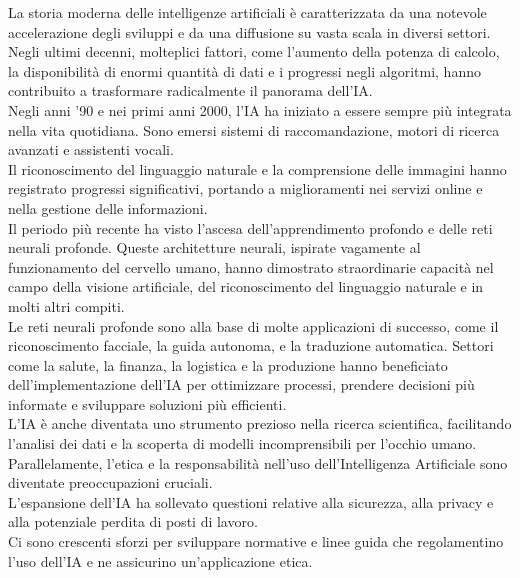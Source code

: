 \documentclass[12pt,a4paper]{report}
\begin{document}
La storia moderna delle intelligenze artificiali è caratterizzata da una notevole accelerazione degli sviluppi e da una diffusione su vasta scala in diversi settori. \\
Negli ultimi decenni, molteplici fattori, come l'aumento della potenza di calcolo, la disponibilità di enormi quantità di dati e i progressi negli algoritmi, hanno contribuito a trasformare radicalmente il panorama dell'IA. \\
Negli anni '90 e nei primi anni 2000, l'IA ha iniziato a essere sempre più integrata nella vita quotidiana. Sono emersi sistemi di raccomandazione, motori di ricerca avanzati e assistenti vocali. \\
Il riconoscimento del linguaggio naturale e la comprensione delle immagini hanno registrato progressi significativi, portando a miglioramenti nei servizi online e nella gestione delle informazioni. \\
Il periodo più recente ha visto l'ascesa dell'apprendimento profondo e delle reti neurali profonde. Queste architetture neurali, ispirate vagamente al funzionamento del cervello umano, hanno dimostrato straordinarie capacità nel campo della visione artificiale, del riconoscimento del linguaggio naturale e in molti altri compiti. \\
Le reti neurali profonde sono alla base di molte applicazioni di successo, come il riconoscimento facciale, la guida autonoma, e la traduzione automatica.
Settori come la salute, la finanza, la logistica e la produzione hanno beneficiato dell'implementazione dell'IA per ottimizzare processi, prendere decisioni più informate e sviluppare soluzioni più efficienti. \\
L'IA è anche diventata uno strumento prezioso nella ricerca scientifica, facilitando l'analisi dei dati e la scoperta di modelli incomprensibili per l'occhio umano.
Parallelamente, l'etica e la responsabilità nell'uso dell'Intelligenza Artificiale sono diventate preoccupazioni cruciali.\\ L'espansione dell'IA ha sollevato questioni relative alla sicurezza, alla privacy e alla potenziale perdita di posti di lavoro. \\
Ci sono crescenti sforzi per sviluppare normative e linee guida che regolamentino l'uso dell'IA e ne assicurino un'applicazione etica.\\
\\
\\
\end{document}

